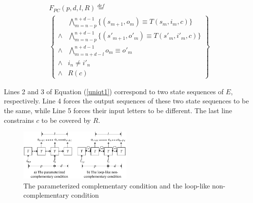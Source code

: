 \documentclass[journal]{IEEEtran}
\begin{document}
\begin{equation}\label{uniqt1}
\begin{split}
&F_{PC}(p,d,l,R)\stackrel{def}{=}\\
&\left\{
\begin{array}{cc}
&\bigwedge_{m=n-p}^{n+d-1}
\{
(s_{m+1},o_m)\equiv T(s_m,i_m,c)
\}
\\
\wedge&\bigwedge_{m=n-p}^{n+d-1}
\{
(s'_{m+1},o'_m)\equiv T(s'_m,i'_m,c)
\}
\\
\wedge&\bigwedge_{m=n+d-l}^{n+d-1}o_m\equiv o'_m \\
\wedge& i_n\ne i'_n \\
\wedge& R(c)
\end{array}
\right\}
\end{split}
\end{equation}


Lines 2 and 3 of Equation (\ref{uniqt1}) correspond to two state sequences of $E$, respectively.
Line 4 forces the output sequences of these two state sequences to be the same,
while Line 5 forces their input letters to be different.
The last line constrains $c$ to be covered by $R$.

\begin{figure}[t]
\begin{center}
\includegraphics[width=0.5\textwidth]{pcln}
\end{center}
\caption{The parameterized complementary condition and the loop-like non-complementary condition}
  \label{fig_pcln}
\end{figure}
\end{document}
